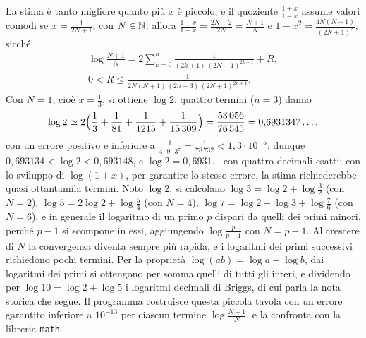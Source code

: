 La stima è tanto migliore quanto più $x$ è piccolo, e il quoziente $\frac{1+x}{1-x}$ assume
valori comodi se $x=\frac1{2N+1}$, con $N\in\mathbb{N}$: allora $\frac{1+x}{1-x}=\frac{2N+2}{2N}=\frac{N+1}N$ e
$1-x^{2}=\frac{4N(N+1)}{(2N+1)^{2}}$, sicché
\begin{equation}\label{eq:log-N}
\begin{gathered}
  \log\frac{N+1}N=2\sum_{k=0}^{n}\frac1{(2k+1)\,(2N+1)^{2k+1}}+R, \\
  0<R\le\frac1{2N(N+1)\,(2n+3)\,(2N+1)^{2n+1}} .
\end{gathered}
\end{equation}
Con $N=1$, cioè $x=\frac13$, si ottiene $\log2$: quattro termini ($n=3$) danno
\[
  \log2\simeq2\Bigl(\frac13+\frac1{81}+\frac1{1215}+\frac1{15\,309}\Bigr)=\frac{53\,056}{76\,545}=0{,}6931347\ldots ,
\]
con un errore positivo e inferiore a $\frac1{4\cdot9\cdot3^{7}}=\frac1{78\,732}<1{,}3\cdot10^{-5}$: dunque
$0{,}693134<\log2<0{,}693148$, e $\log2=0{,}6931\ldots$ con quattro decimali esatti; con lo
sviluppo di $\log(1+x)$, per garantire lo stesso errore, la stima richiederebbe quasi
ottantamila termini. Noto $\log2$, si calcolano
$\log3=\log2+\log\frac32$ (con $N=2$), $\log5=2\log2+\log\frac54$ (con $N=4$),
$\log7=\log2+\log3+\log\frac76$ (con $N=6$), e in generale il logaritmo di un primo $p$ dispari
da quelli dei primi minori, perché $p-1$ si scompone in essi, aggiungendo $\log\frac p{p-1}$
con $N=p-1$. Al crescere di $N$ la convergenza diventa sempre più rapida, e i
logaritmi dei primi successivi richiedono pochi termini. Per la proprietà $\log(ab)=\log a+\log b$, dai
logaritmi dei primi si ottengono per somma quelli di tutti gli interi, e dividendo per
$\log10=\log2+\log5$ i logaritmi decimali di Briggs, di cui parla la nota storica che
segue. Il programma costruisce questa piccola tavola con un errore garantito inferiore a
$10^{-13}$ per ciascun termine $\log\frac{N+1}N$, e la confronta con la libreria \texttt{math}.

